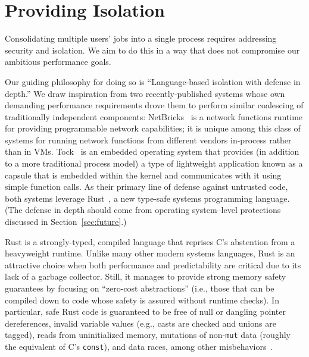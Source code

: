 \section{Providing Isolation}
\label{sec:isolation}

Consolidating multiple users' jobs into a single process requires
addressing security and isolation. We aim to do this in a way that does not
compromise our ambitious performance goals.

Our guiding philosophy for doing so is ``Language-based isolation with defense in depth.''
We draw inspiration from two recently-published systems whose own demanding
performance requirements drove them to perform similar coalescing of traditionally
independent components:  NetBricks~\cite{Panda2016} is a network functions runtime
for providing programmable network capabilities; it is unique among this class of
systems for running network functions from different vendors in-process rather than in VMs.
Tock~\cite{Levy2017} is an embedded operating system that provides (in addition to a
more traditional process model) a type of lightweight application known as a capsule
that is embedded within the kernel and communicates with it using simple function
calls.  As their primary line of defense against untrusted code, both systems
leverage Rust~\cite{www-rustlang}, a new type-safe systems programming language.
(The defense in depth should come from operating system--level protections discussed
in Section~\ref{sec:future}.)

Rust is a strongly-typed, compiled language that reprises C's abstention from a
heavyweight runtime.  Unlike many other modern systems languages, Rust is an
attractive choice when both performance and predictability are critical due to its
lack of a garbage collector.  Still, it manages to provide strong memory safety
guarantees by focusing on ``zero-cost abstractions'' (i.e., those that can be
compiled down to code whose safety is assured without runtime checks).  In
particular, safe Rust code is guaranteed to be free of null or dangling pointer
dereferences, invalid variable values (e.g., casts are checked and unions are
tagged), reads from uninitialized memory, mutations of non-\texttt{mut} data (roughly
the equivalent of C's \texttt{const}), and data races, among other
misbehaviors~\cite{www-rustlang-ub}.


